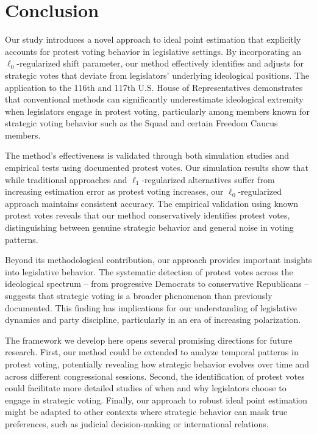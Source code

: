 \documentclass[11pt]{article}
\begin{document}
\section{Conclusion}\label{sec_8}
Our study introduces a novel approach to ideal point estimation that explicitly accounts for protest voting behavior in legislative settings. By incorporating an $\ell_0$-regularized shift parameter, our method effectively identifies and adjusts for strategic votes that deviate from legislators' underlying ideological positions. The application to the 116th and 117th U.S. House of Representatives demonstrates that conventional methods can significantly underestimate ideological extremity when legislators engage in protest voting, particularly among members known for strategic voting behavior such as the Squad and certain Freedom Caucus members.

The method's effectiveness is validated through both simulation studies and empirical tests using documented protest votes. Our simulation results show that while traditional approaches and $\ell_1$-regularized alternatives suffer from increasing estimation error as protest voting increases, our $\ell_0$-regularized approach maintains consistent accuracy. The empirical validation using known protest votes reveals that our method conservatively identifies protest votes, distinguishing between genuine strategic behavior and general noise in voting patterns.

Beyond its methodological contribution, our approach provides important insights into legislative behavior. The systematic detection of protest votes across the ideological spectrum – from progressive Democrats to conservative Republicans – suggests that strategic voting is a broader phenomenon than previously documented. This finding has implications for our understanding of legislative dynamics and party discipline, particularly in an era of increasing polarization.

The framework we develop here opens several promising directions for future research. First, our method could be extended to analyze temporal patterns in protest voting, potentially revealing how strategic behavior evolves over time and across different congressional sessions. Second, the identification of protest votes could facilitate more detailed studies of when and why legislators choose to engage in strategic voting. Finally, our approach to robust ideal point estimation might be adapted to other contexts where strategic behavior can mask true preferences, such as judicial decision-making or international relations.
\end{document}
